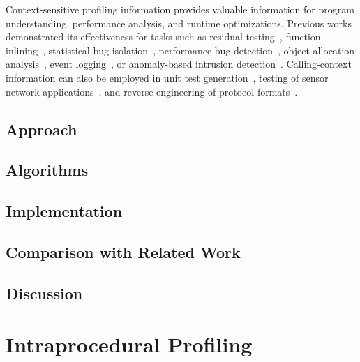 Context-sensitive profiling information provides valuable information for program understanding, performance analysis, and runtime optimizations. Previous works demonstrated its effectiveness for tasks such as residual testing~\cite{PavlopoulouY99,Vaswani07}, function inlining~\cite{Chang92}, statistical bug isolation~\cite{Feng03,Liblit03}, performance bug detection~\cite{Nistor13}, object allocation analysis~\cite{Nethercote07}, event logging~\cite{Zhang06}, or anomaly-based intrusion detection~\cite{Bond07}.
Calling-context information can also be employed in unit test generation~\cite{Villazon09}, testing of sensor network applications~\cite{Lai08}, and reverse engineering of protocol formats~\cite{Lin08}.



\subsection{Approach}

\subsection{Algorithms}

\subsection{Implementation}

\subsection{Comparison with Related Work}

\subsection{Discussion}

\section{Intraprocedural Profiling}

